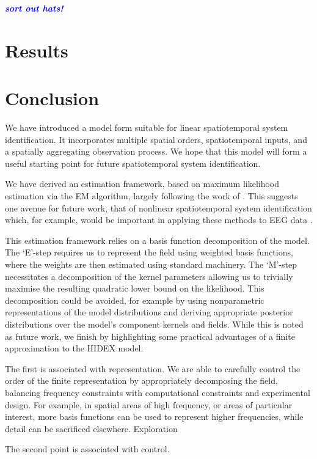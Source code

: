 \documentclass{IEEEtran}
\newcommand{\todo}[1]{\textsf{\emph{\textbf{\textcolor{blue}{#1}}}}}
\begin{document}
\todo{sort out hats!}

\section{Results}

\section{Conclusion}

We have introduced a model form suitable for linear spatiotemporal system identification. It incorporates multiple spatial orders, spatiotemporal inputs, and a spatially aggregating observation process. We hope that this model will form a useful starting point for future spatiotemporal system identification. 

We have derived an estimation framework, based on maximum likelihood estimation via the EM algorithm, largely following the work of \cite{Gibson}. This suggests one avenue for future work, that of nonlinear spatiotemporal system identification which, for example, would be important in applying these methods to EEG data \cite{Schiff}. 

This estimation framework relies on a basis function decomposition of the model. The `E'-step requires us to represent the field using weighted basis functions, where the weights are then estimated using standard machinery. The `M'-step necessitates a decomposition of the kernel parameters allowing us to trivially maximise the resulting quadratic lower bound on the likelihood. This decomposition could be avoided, for example by using nonparametric representations of the model distributions and deriving appropriate posterior distributions over the model's component kernels and fields. While this is noted as future work, we finish by highlighting some practical advantages of a finite approximation to the HIDEX model. 

The first is associated with representation. We are able to carefully control the order of the finite representation by appropriately decomposing the field, balancing frequency constraints \cite{Scerri} with computational constraints and experimental design. For example, in spatial areas of high frequency, or areas of particular interest, more basis functions can be used to represent higher frequencies, while detail can be sacrificed elsewhere. Exploration 

The second point is associated with control.
\end{document}
